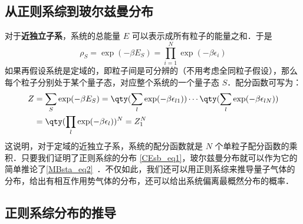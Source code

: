 \subsection{从正则系综到玻尔兹曼分布}
对于\textbf{近独立子系}，系统的总能量 $E$ 可以表示成所有粒子的能量之和．于是
\begin{equation}
\rho_S=\exp(-\beta E_S)=\prod_{i=1}^N\exp(-\beta\epsilon_i)
\end{equation}
如果再假设系统是定域的，即粒子间是可分辨的（不用考虑全同粒子假设），那么每个粒子分别处于某个量子态，对应整个系统的一个量子态 $S$．配分函数可写为：
\begin{equation}
\begin{aligned}
Z&=\sum_S\exp(-\beta E_S)=\qty(\sum_{l}\exp(-\beta\epsilon_{l1}))\cdots\qty(\sum_{l}\exp(-\beta\epsilon_{lN}))\\
&=\qty(\prod_{l}\exp(-\beta\epsilon_{l}))^N=Z_1^N
\end{aligned}
\end{equation}
这说明，对于定域的近独立子系，系统的配分函数就是 $N$ 个单粒子配分函数的乘积．只要我们证明了正则系综的分布 \autoref{CEsb_eq1}，玻尔兹曼分布就可以作为它的简单推论了\autoref{MBsta_eq2}~．不仅如此，我们还可以用正则系综来推导量子气体的分布，给出有相互作用势气体的分布，还可以给出系统偏离最概然分布的概率．
\subsection{正则系综分布的推导}
